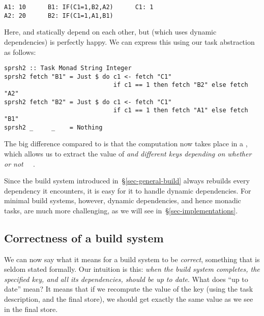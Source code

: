\vspace{1mm}
\begin{verbatim}
A1: 10      B1: IF(C1=1,B2,A2)      C1: 1
A2: 20      B2: IF(C1=1,A1,B1)
\end{verbatim}

\noindent
Here,  and  statically depend on each other, but \Excel (which
uses dynamic dependencies) is perfectly happy. We can express this using
our task abstraction as follows:


\vspace{1mm}
\begin{verbatim}
sprsh2 :: Task Monad String Integer
sprsh2 fetch "B1" = Just $ do c1 <- fetch "C1"
                              if c1 == 1 then fetch "B2" else fetch "A2"
sprsh2 fetch "B2" = Just $ do c1 <- fetch "C1"
                              if c1 == 1 then fetch "A1" else fetch "B1"
sprsh2 _     _    = Nothing
\end{verbatim}
\vspace{1mm}

\noindent
The big difference compared to  is that the computation now takes
place in a , which allows us to extract the value of  \emph{and
 different keys depending on whether or not ~\hs{==}~}.

Since the  build system introduced in~\S\ref{sec-general-build} always
rebuilds every dependency it encounters, it is easy for it to handle dynamic
dependencies. For minimal build systems, however, dynamic dependencies, and hence
monadic tasks, are much more challenging, as we will see
in~\S\ref{sec-implementations}.

\subsection{Correctness of a build system} \label{sec-build-correctness}

We can now say what it means for a build system to be \emph{correct}, something
that is seldom stated formally. Our intuition is this: \emph{when the build
system completes, the specified key, and all its dependencies, should be up to
date}. What does ``up to date'' mean? It means that if we recompute the value of
the key (using the task description, and the final store), we should get exactly
the same value as we see in the final store.

